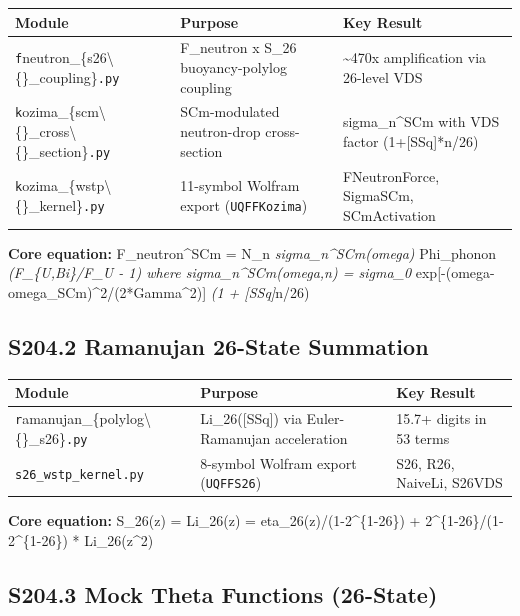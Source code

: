 \documentclass[11pt]{article}
\begin{document}
\begin{center}
\begin{longtable}{lll}
\toprule
Module & Purpose & Key Result \tabularnewline
\midrule
\endhead
\verb|f|neutron\_\{s26\textbackslash\{\}\_coupling\}\verb|.py| & F\_neutron x S\_26 buoyancy-polylog coupling & \textasciitilde{}470x amplification via 26-level VDS \tabularnewline
\verb|k|ozima\_\{scm\textbackslash\{\}\_cross\textbackslash\{\}\_section\}\verb|.py| & SCm-modulated neutron-drop cross-section & sigma\_n\textasciicircum{}SCm with VDS factor (1+[SSq]*n/26) \tabularnewline
\verb|k|ozima\_\{wstp\textbackslash\{\}\_kernel\}\verb|.py| & 11-symbol Wolfram export (\verb|UQFFKozima|) & FNeutronForce, SigmaSCm, SCmActivation \tabularnewline
\bottomrule
\end{longtable}
\end{center}

\textbf{Core equation:} F\_neutron\textasciicircum{}SCm = N\_n \emph{ sigma\_n\textasciicircum{}SCm(omega) } Phi\_phonon \emph{ (F\_\{U,Bi\}/F\_U - 1) where sigma\_n\textasciicircum{}SCm(omega,n) = sigma\_0 } exp[-(omega-omega\_SCm)\textasciicircum{}2/(2*Gamma\textasciicircum{}2)] \emph{ (1 + [SSq]}n/26)

\subsection*{S204.2 Ramanujan 26-State Summation}

\begin{center}
\begin{longtable}{lll}
\toprule
Module & Purpose & Key Result \tabularnewline
\midrule
\endhead
\verb|r|amanujan\_\{polylog\textbackslash\{\}\_s26\}\verb|.py| & Li\_26([SSq]) via Euler-Ramanujan acceleration & 15.7+ digits in 53 terms \tabularnewline
\verb|s26_wstp_kernel.py| & 8-symbol Wolfram export (\verb|UQFFS26|) & S26, R26, NaiveLi, S26VDS \tabularnewline
\bottomrule
\end{longtable}
\end{center}

\textbf{Core equation:} S\_26(z) = Li\_26(z) = eta\_26(z)/(1-2\textasciicircum{}\{1-26\}) + 2\textasciicircum{}\{1-26\}/(1-2\textasciicircum{}\{1-26\}) * Li\_26(z\textasciicircum{}2)

\subsection*{S204.3 Mock Theta Functions (26-State)}
\end{document}
